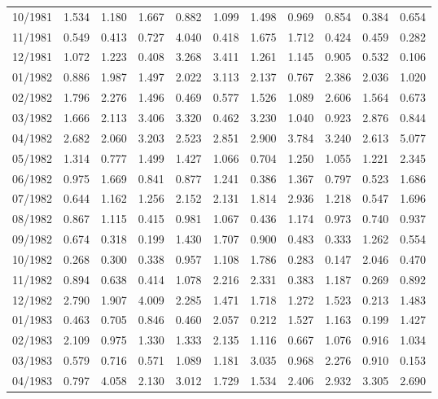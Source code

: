 \begin{tabular}{lrrrrrrrrrr}
10/1981 &  1.534 &  1.180 &  1.667 &  0.882 &  1.099 &  1.498 &  0.969 &  0.854 &  0.384 &  0.654 \\
11/1981 &  0.549 &  0.413 &  0.727 &  4.040 &  0.418 &  1.675 &  1.712 &  0.424 &  0.459 &  0.282 \\
12/1981 &  1.072 &  1.223 &  0.408 &  3.268 &  3.411 &  1.261 &  1.145 &  0.905 &  0.532 &  0.106 \\
01/1982 &  0.886 &  1.987 &  1.497 &  2.022 &  3.113 &  2.137 &  0.767 &  2.386 &  2.036 &  1.020 \\
02/1982 &  1.796 &  2.276 &  1.496 &  0.469 &  0.577 &  1.526 &  1.089 &  2.606 &  1.564 &  0.673 \\
03/1982 &  1.666 &  2.113 &  3.406 &  3.320 &  0.462 &  3.230 &  1.040 &  0.923 &  2.876 &  0.844 \\
04/1982 &  2.682 &  2.060 &  3.203 &  2.523 &  2.851 &  2.900 &  3.784 &  3.240 &  2.613 &  5.077 \\
05/1982 &  1.314 &  0.777 &  1.499 &  1.427 &  1.066 &  0.704 &  1.250 &  1.055 &  1.221 &  2.345 \\
06/1982 &  0.975 &  1.669 &  0.841 &  0.877 &  1.241 &  0.386 &  1.367 &  0.797 &  0.523 &  1.686 \\
07/1982 &  0.644 &  1.162 &  1.256 &  2.152 &  2.131 &  1.814 &  2.936 &  1.218 &  0.547 &  1.696 \\
08/1982 &  0.867 &  1.115 &  0.415 &  0.981 &  1.067 &  0.436 &  1.174 &  0.973 &  0.740 &  0.937 \\
09/1982 &  0.674 &  0.318 &  0.199 &  1.430 &  1.707 &  0.900 &  0.483 &  0.333 &  1.262 &  0.554 \\
10/1982 &  0.268 &  0.300 &  0.338 &  0.957 &  1.108 &  1.786 &  0.283 &  0.147 &  2.046 &  0.470 \\
11/1982 &  0.894 &  0.638 &  0.414 &  1.078 &  2.216 &  2.331 &  0.383 &  1.187 &  0.269 &  0.892 \\
12/1982 &  2.790 &  1.907 &  4.009 &  2.285 &  1.471 &  1.718 &  1.272 &  1.523 &  0.213 &  1.483 \\
01/1983 &  0.463 &  0.705 &  0.846 &  0.460 &  2.057 &  0.212 &  1.527 &  1.163 &  0.199 &  1.427 \\
02/1983 &  2.109 &  0.975 &  1.330 &  1.333 &  2.135 &  1.116 &  0.667 &  1.076 &  0.916 &  1.034 \\
03/1983 &  0.579 &  0.716 &  0.571 &  1.089 &  1.181 &  3.035 &  0.968 &  2.276 &  0.910 &  0.153 \\
04/1983 &  0.797 &  4.058 &  2.130 &  3.012 &  1.729 &  1.534 &  2.406 &  2.932 &  3.305 &  2.690 \\

\end{tabular}
